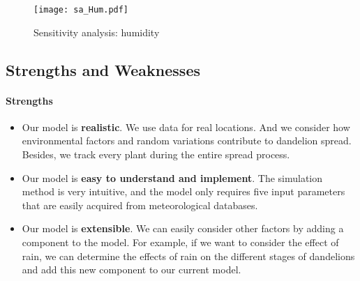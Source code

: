 \documentclass[12pt]{article}
\begin{document}
			\begin{figure}[htbp]
				\centering
				\texttt{[image: sa\_Hum.pdf]}
				\caption{Sensitivity analysis: humidity}
				\label{fig:saH}
			\end{figure}
			
			
			
		\subsection{Strengths and Weaknesses}
		
			\paragraph{Strengths}
			\vspace{-0.1cm}
			\begin{itemize}
				\vspace{-0.3cm}
				\item Our model is \textbf{realistic}.  We use data for real locations.  And we consider how environmental factors and random variations contribute to dandelion spread.  Besides, we track every plant during the entire spread process.  
				
				\vspace{-0.3cm}
				\item Our model is \textbf{easy to understand and implement}.  The simulation method is very intuitive, and the model only requires five input parameters that are easily acquired from meteorological databases.
				
				\vspace{-0.3cm}
				\item Our model is \textbf{extensible}.  We can easily consider other factors by adding a component to the model.  For example, if we want to consider the effect of rain, we can determine the effects of rain on the different stages of dandelions and add this new component to our current model.
			\end{itemize}
			
\end{document}
